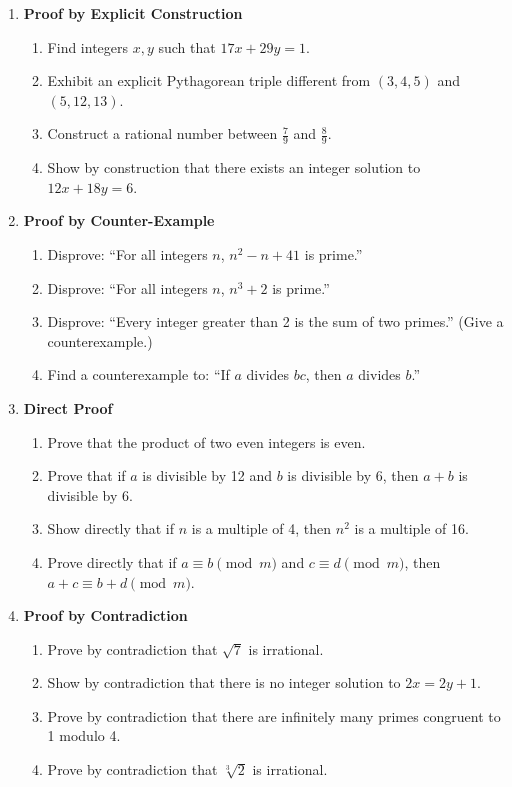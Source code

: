\begin{enumerate}
\item \textbf{Proof by Explicit Construction}
  \begin{enumerate}
    \item Find integers $x,y$ such that $17x+29y=1$.
    \item Exhibit an explicit Pythagorean triple different from $(3,4,5)$ and $(5,12,13)$.
    \item Construct a rational number between $\tfrac{7}{9}$ and $\tfrac{8}{9}$.
    \item Show by construction that there exists an integer solution to $12x+18y=6$.
  \end{enumerate}

\item \textbf{Proof by Counter-Example}
  \begin{enumerate}
    \item Disprove: ``For all integers $n$, $n^2-n+41$ is prime.''
    \item Disprove: ``For all integers $n$, $n^3+2$ is prime.''
    \item Disprove: ``Every integer greater than 2 is the sum of two primes.'' (Give a counterexample.)
    \item Find a counterexample to: ``If $a$ divides $bc$, then $a$ divides $b$.'' 
  \end{enumerate}

\item \textbf{Direct Proof}
  \begin{enumerate}
    \item Prove that the product of two even integers is even.
    \item Prove that if $a$ is divisible by 12 and $b$ is divisible by 6, then $a+b$ is divisible by 6.
    \item Show directly that if $n$ is a multiple of 4, then $n^2$ is a multiple of 16.
    \item Prove directly that if $a\equiv b \pmod{m}$ and $c\equiv d \pmod{m}$, then $a+c \equiv b+d \pmod{m}$.
  \end{enumerate}

\item \textbf{Proof by Contradiction}
  \begin{enumerate}
    \item Prove by contradiction that $\sqrt{7}$ is irrational.
    \item Show by contradiction that there is no integer solution to $2x=2y+1$.
    \item Prove by contradiction that there are infinitely many primes congruent to 1 modulo 4.
    \item Prove by contradiction that $\sqrt[3]{2}$ is irrational.
  \end{enumerate}


\end{enumerate}
